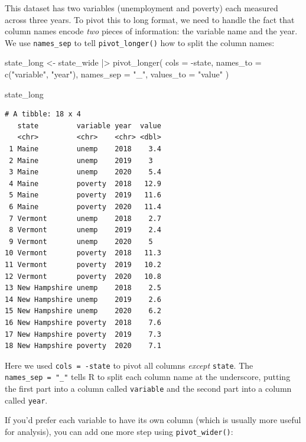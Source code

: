 \documentclass[
  letterpaper,
  DIV=11,
  numbers=noendperiod]{scrreprt}
\newenvironment{Shaded}{\begin{snugshade}}{\end{snugshade}}
\newcommand{\AttributeTok}[1]{\textcolor[rgb]{0.40,0.45,0.13}{#1}}
\newcommand{\FunctionTok}[1]{\textcolor[rgb]{0.28,0.35,0.67}{#1}}
\newcommand{\NormalTok}[1]{\textcolor[rgb]{0.00,0.23,0.31}{#1}}
\newcommand{\OtherTok}[1]{\textcolor[rgb]{0.00,0.23,0.31}{#1}}
\newcommand{\SpecialCharTok}[1]{\textcolor[rgb]{0.37,0.37,0.37}{#1}}
\newcommand{\StringTok}[1]{\textcolor[rgb]{0.13,0.47,0.30}{#1}}
\begin{document}
This dataset has two variables (unemployment and poverty) each measured
across three years. To pivot this to long format, we need to handle the
fact that column names encode \emph{two} pieces of information: the
variable name and the year. We use \texttt{names\_sep} to tell
\texttt{pivot\_longer()} how to split the column names:

\begin{Shaded}
\begin{Highlighting}[]
\NormalTok{state\_long }\OtherTok{\textless{}{-}}\NormalTok{ state\_wide }\SpecialCharTok{|\textgreater{}}
  \FunctionTok{pivot\_longer}\NormalTok{(}
    \AttributeTok{cols =} \SpecialCharTok{{-}}\NormalTok{state,}
    \AttributeTok{names\_to =} \FunctionTok{c}\NormalTok{(}\StringTok{"variable"}\NormalTok{, }\StringTok{"year"}\NormalTok{),}
    \AttributeTok{names\_sep =} \StringTok{"\_"}\NormalTok{,}
    \AttributeTok{values\_to =} \StringTok{"value"}
\NormalTok{  )}

\NormalTok{state\_long}
\end{Highlighting}
\end{Shaded}

\begin{verbatim}
# A tibble: 18 x 4
   state         variable year  value
   <chr>         <chr>    <chr> <dbl>
 1 Maine         unemp    2018    3.4
 2 Maine         unemp    2019    3  
 3 Maine         unemp    2020    5.4
 4 Maine         poverty  2018   12.9
 5 Maine         poverty  2019   11.6
 6 Maine         poverty  2020   11.4
 7 Vermont       unemp    2018    2.7
 8 Vermont       unemp    2019    2.4
 9 Vermont       unemp    2020    5  
10 Vermont       poverty  2018   11.3
11 Vermont       poverty  2019   10.2
12 Vermont       poverty  2020   10.8
13 New Hampshire unemp    2018    2.5
14 New Hampshire unemp    2019    2.6
15 New Hampshire unemp    2020    6.2
16 New Hampshire poverty  2018    7.6
17 New Hampshire poverty  2019    7.3
18 New Hampshire poverty  2020    7.1
\end{verbatim}

Here we used \texttt{cols\ =\ -state} to pivot all columns \emph{except}
\texttt{state}. The \texttt{names\_sep\ =\ "\_"} tells R to split each
column name at the underscore, putting the first part into a column
called \texttt{variable} and the second part into a column called
\texttt{year}.

If you'd prefer each variable to have its own column (which is usually
more useful for analysis), you can add one more step using
\texttt{pivot\_wider()}:
\end{document}
